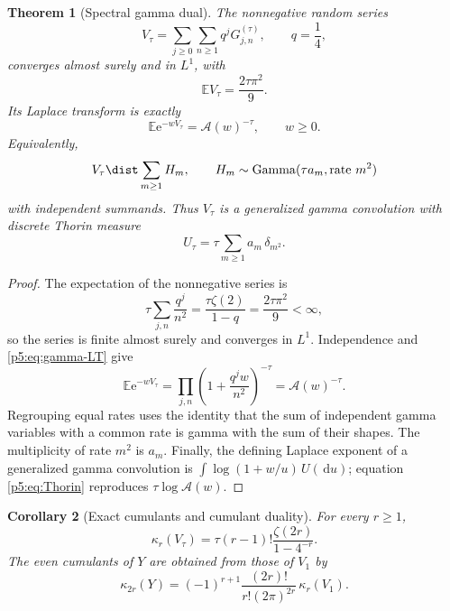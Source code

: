 \documentclass[11pt]{article}
\numberwithin{equation}{section}
\newtheorem{theorem}{Theorem}[section]
\newtheorem{corollary}[theorem]{Corollary}
\theoremstyle{definition}
\theoremstyle{remark}
\newcommand{\E}{\mathbb E}
\newcommand{\dd}{\,\mathrm d}
\newcommand{\e}{\mathrm e}
\begin{document}
\begin{theorem}[Spectral gamma dual]\label{p5:thm:gamma-dual}
The nonnegative random series
\begin{equation}\label{p5:eq:Vtau-layered}
 V_\tau=\sum_{j\ge0}\sum_{n\ge1}q^jG_{j,n}^{(\tau)},
 \qquad q=\frac14,
\end{equation}
converges almost surely and in $L^1$, with
\begin{equation}\label{p5:eq:V-mean}
 \E V_\tau=\frac{2\tau\pi^2}{9}.
\end{equation}
Its Laplace transform is exactly
\begin{equation}\label{p5:eq:V-LT}
 \boxed{\E\e^{-wV_\tau}=\mathcal A(w)^{-\tau}},\qquad w\ge0.
\end{equation}
Equivalently,
\begin{equation}\label{p5:eq:V-grouped}
 V_\tau\dist\sum_{m\ge1}H_m,
 \qquad
 H_m\sim\operatorname{Gamma}(\tau a_m,\text{rate }m^2)
\end{equation}
with independent summands.  Thus $V_\tau$ is a generalized gamma convolution
with discrete Thorin measure
\begin{equation}\label{p5:eq:Thorin}
 \boxed{U_\tau=\tau\sum_{m\ge1}a_m\,\delta_{m^2}.}
\end{equation}
\end{theorem}

\begin{proof}
The expectation of the nonnegative series is
\[
 \tau\sum_{j,n}\frac{q^j}{n^2}
 =\frac{\tau\zeta(2)}{1-q}=\frac{2\tau\pi^2}{9}<\infty,
\]
so the series is finite almost surely and converges in $L^1$.  Independence and
\cref{p5:eq:gamma-LT} give
\[
 \E\e^{-wV_\tau}
 =\prod_{j,n}\left(1+\frac{q^jw}{n^2}\right)^{-\tau}
 =\mathcal A(w)^{-\tau}.
\]
Regrouping equal rates uses the identity that the sum of independent gamma
variables with a common rate is gamma with the sum of their shapes.  The
multiplicity of rate $m^2$ is $a_m$.  Finally, the defining Laplace exponent of
a generalized gamma convolution is
$\int\log(1+w/u)\,U(\dd u)$; equation \cref{p5:eq:Thorin} reproduces
$\tau\log\mathcal A(w)$.
\end{proof}

\begin{corollary}[Exact cumulants and cumulant duality]\label{p5:cor:V-cumulants}
For every $r\ge1$,
\begin{equation}\label{p5:eq:V-cumulants}
 \boxed{
 \kappa_r(V_\tau)=\tau(r-1)!\frac{\zeta(2r)}{1-4^{-r}}.}
\end{equation}
The even cumulants of $Y$ are obtained from those of $V_1$ by
\begin{equation}\label{p5:eq:cumulant-duality}
 \boxed{
 \kappa_{2r}(Y)=(-1)^{r+1}
 \frac{(2r)!}{r!(2\pi)^{2r}}\,\kappa_r(V_1).}
\end{equation}
\end{corollary}
\end{document}
